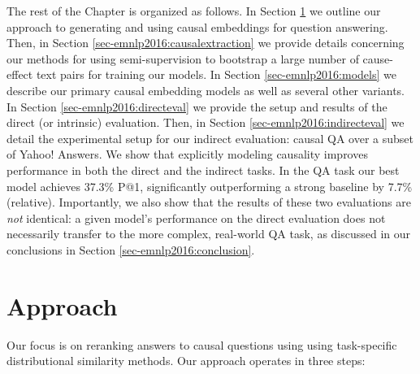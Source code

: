 The rest of the Chapter is organized as follows.  In Section \ref{sec-emnlp2016:approach} we outline our approach to generating and using causal embeddings for question answering.  Then, in Section \ref{sec-emnlp2016:causalextraction} we provide details concerning our methods for using semi-supervision to bootstrap a large number of cause-effect text pairs for training our models.  In Section \ref{sec-emnlp2016:models} we describe our primary causal embedding models as well as several other variants.  In Section \ref{sec-emnlp2016:directeval} we provide the setup and results of the direct (or intrinsic) evaluation.  Then, in Section \ref{sec-emnlp2016:indirecteval} we detail the experimental setup for our indirect evaluation: causal QA over a subset of Yahoo! Answers.  We show that explicitly modeling causality improves performance in both the direct and the indirect tasks. In the QA task our best model achieves 37.3\% P@1, significantly outperforming a strong baseline by 7.7\% (relative). 
Importantly, we also show that the results of these two evaluations are \emph{not} identical: a given model's performance on the direct evaluation does not necessarily transfer to the more complex, real-world QA task, as discussed in our conclusions in Section \ref{sec-emnlp2016:conclusion}.


%
\section{Approach}
\label{sec-emnlp2016:approach}

Our focus is on reranking answers to causal questions using using task-specific distributional similarity methods.
%
Our approach operates in three steps:

